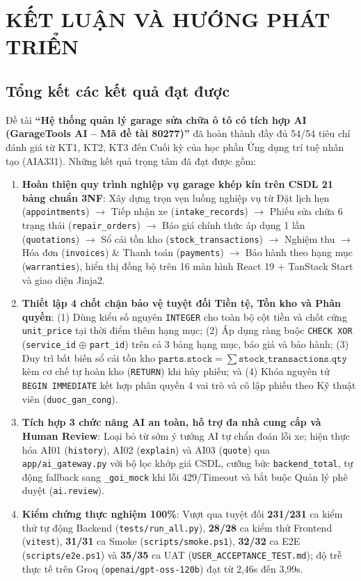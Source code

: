 \chapter{KẾT LUẬN VÀ HƯỚNG PHÁT TRIỂN}

\section{Tổng kết các kết quả đạt được}

Đề tài \textbf{“Hệ thống quản lý garage sửa chữa ô tô có tích hợp AI (GarageTools AI -- Mã đề tài 80277)”} đã hoàn thành đầy đủ 54/54 tiêu chí đánh giá từ KT1, KT2, KT3 đến Cuối kỳ của học phần Ứng dụng trí tuệ nhân tạo (AIA331). Những kết quả trọng tâm đã đạt được gồm:
\begin{enumerate}[noitemsep,topsep=2pt]
  \item \textbf{Hoàn thiện quy trình nghiệp vụ garage khép kín trên CSDL 21 bảng chuẩn 3NF}: Xây dựng trọn vẹn luồng nghiệp vụ từ Đặt lịch hẹn (\texttt{appointments}) $\rightarrow$ Tiếp nhận xe (\texttt{intake\_records}) $\rightarrow$ Phiếu sửa chữa 6 trạng thái (\texttt{repair\_orders}) $\rightarrow$ Báo giá chính thức áp dụng 1 lần (\texttt{quotations}) $\rightarrow$ Sổ cái tồn kho (\texttt{stock\_transactions}) $\rightarrow$ Nghiệm thu $\rightarrow$ Hóa đơn (\texttt{invoices}) \& Thanh toán (\texttt{payments}) $\rightarrow$ Bảo hành theo hạng mục (\texttt{warranties}), hiển thị đồng bộ trên 16 màn hình React 19 + TanStack Start và giao diện Jinja2.
  \item \textbf{Thiết lập 4 chốt chặn bảo vệ tuyệt đối Tiền tệ, Tồn kho và Phân quyền}: (1) Dùng kiểu số nguyên \texttt{INTEGER} cho toàn bộ cột tiền và chốt cứng \texttt{unit\_price} tại thời điểm thêm hạng mục; (2) Áp dụng ràng buộc \texttt{CHECK XOR} (\texttt{service\_id} $\oplus$ \texttt{part\_id}) trên cả 3 bảng hạng mục, báo giá và bảo hành; (3) Duy trì bất biến sổ cái tồn kho $\texttt{parts.stock} = \sum \texttt{stock\_transactions.qty}$ kèm cơ chế tự hoàn kho (\texttt{RETURN}) khi hủy phiếu; và (4) Khóa nguyên tử \texttt{BEGIN IMMEDIATE} kết hợp phân quyền 4 vai trò và cô lập phiếu theo Kỹ thuật viên (\texttt{duoc\_gan\_cong}).
  \item \textbf{Tích hợp 3 chức năng AI an toàn, hỗ trợ đa nhà cung cấp và Human Review}: Loại bỏ từ sớm ý tưởng AI tự chẩn đoán lỗi xe; hiện thực hóa AI01 (\texttt{history}), AI02 (\texttt{explain}) và AI03 (\texttt{quote}) qua \texttt{app/ai\_gateway.py} với bộ lọc khớp giá CSDL, cưỡng bức \texttt{backend\_total}, tự động fallback sang \texttt{\_goi\_mock} khi lỗi 429/Timeout và bắt buộc Quản lý phê duyệt (\texttt{ai.review}).
  \item \textbf{Kiểm chứng thực nghiệm 100\%}: Vượt qua tuyệt đối \textbf{231/231} ca kiểm thử tự động Backend (\texttt{tests/run\_all.py}), \textbf{28/28} ca kiểm thử Frontend (\texttt{vitest}), \textbf{31/31} ca Smoke (\texttt{scripts/smoke.ps1}), \textbf{32/32} ca E2E (\texttt{scripts/e2e.ps1}) và \textbf{35/35} ca UAT (\texttt{USER\_ACCEPTANCE\_TEST.md}); độ trễ thực tế trên Groq (\texttt{openai/gpt-oss-120b}) đạt từ 2,46s đến 3,99s.
\end{enumerate}


